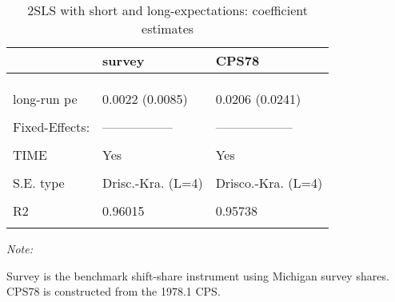 \begin{table}

\caption{2SLS with short and long-expectations: coefficient estimates}
\centering
\begin{threeparttable}
\begin{tabular}[t]{lll}
\toprule
  & survey & CPS78\\
\midrule
\cellcolor{gray!6}{Dependent Var.:} & \cellcolor{gray!6}{RegInf} & \cellcolor{gray!6}{RegInf}\\
\addlinespace
 &  & \\
\addlinespace
\cellcolor{gray!6}{short-run pe} & \cellcolor{gray!6}{0.1280** (0.0445)} & \cellcolor{gray!6}{0.2289*** (0.0621)}\\
\addlinespace
long-run pe & 0.0022 (0.0085) & 0.0206 (0.0241)\\
\addlinespace
\cellcolor{gray!6}{Controls} & \cellcolor{gray!6}{Yes} & \cellcolor{gray!6}{Yes}\\
\addlinespace
Fixed-Effects: & ----------------- & ------------------\\
\addlinespace
\cellcolor{gray!6}{REGION} & \cellcolor{gray!6}{Yes} & \cellcolor{gray!6}{Yes}\\
\addlinespace
TIME & Yes & Yes\\
\addlinespace
\cellcolor{gray!6}{\_\_\_\_\_\_\_\_\_\_\_\_\_\_\_} & \cellcolor{gray!6}{\_\_\_\_\_\_\_\_\_\_\_\_\_\_\_\_\_} & \cellcolor{gray!6}{\_\_\_\_\_\_\_\_\_\_\_\_\_\_\_\_\_\_}\\
\addlinespace
S.E. type & Drisc.-Kra. (L=4) & Drisco.-Kra. (L=4)\\
\addlinespace
\cellcolor{gray!6}{Observations} & \cellcolor{gray!6}{1,387} & \cellcolor{gray!6}{1,387}\\
\addlinespace
R2 & 0.96015 & 0.95738\\
\addlinespace
\cellcolor{gray!6}{Within R2} & \cellcolor{gray!6}{0.61397} & \cellcolor{gray!6}{0.58712}\\
\bottomrule
\end{tabular}
\begin{tablenotes}
\item \textit{Note: } 
\item Survey is the benchmark shift-share instrument using Michigan survey shares. CPS78 is constructed from the 1978.1 CPS.
\end{tablenotes}
\end{threeparttable}
\end{table}
